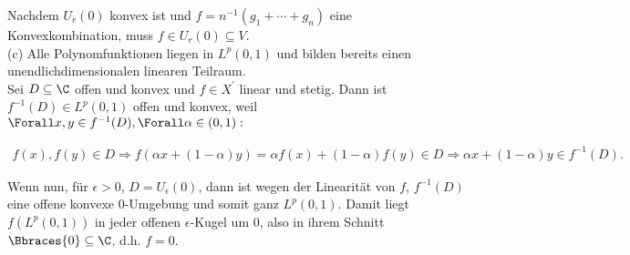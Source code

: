 \begin{solution}
Nachdem $U_r(0)$ konvex ist und $f = n^{-1}(g_1 + \cdots + g_n)$ eine Konvexkombination, muss $f \in U_r(0) \subseteq V$. \\

(c)
Alle Polynomfunktionen liegen in $L^p(0, 1)$ und bilden bereits einen unendlichdimensionalen linearen Teilraum. \\

Sei $D \subseteq \C$ offen und konvex und $f \in X^\prime$ linear und stetig. Dann ist $f^{-1}(D) \in L^p(0, 1)$ offen und konvex, weil $\Forall x, y \in f^{-1}(D), \Forall \alpha \in (0, 1):$

\begin{align*}
  f(x), f(y) \in D
  \Rightarrow
  f(\alpha x + (1 - \alpha) y)
  =
  \alpha f(x) + (1 - \alpha) f(y) \in D
  \Rightarrow
  \alpha x + (1 - \alpha) y \in f^{-1}(D).
\end{align*}

Wenn nun, für $\epsilon > 0$, $D = U_\epsilon(0)$, dann ist wegen der Linearität von $f$, $f^{-1}(D)$ eine offene konvexe $0$-Umgebung und somit ganz $L^p(0, 1)$. Damit liegt $f(L^p(0, 1))$ in jeder offenen $\epsilon$-Kugel um $0$, also in ihrem Schnitt $\Bbraces{0} \subseteq \C$, d.h. $f = 0$.

\end{solution}
